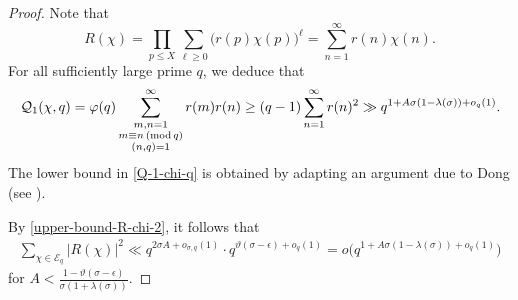 \documentclass[12pt]{amsart}
\numberwithin{equation}{section}
\theoremstyle{plain}
\theoremstyle{remark}
\theoremstyle{definition}
\theoremstyle{remark}
\renewcommand{\mod}[1]{\,({\rm mod}\,#1)}
\begin{document}
\begin{proof}
Note that
\[
R(\chi)=\prod_{p\leq X}\sum_{\ell\geq0}\big(r(p)\chi(p)\big)^{\ell}=\sum_{n=1}^{\infty}r(n)\chi(n).
\]
For all sufficiently large prime $q$, we deduce that
\begin{equation}\label{Q-1-chi-q}
\begin{aligned}
\mathcal{Q}_1(\chi,q)
=\varphi(q)\sum_{\substack{m,n=1 \\ m\equiv n\mod q \\ (n,q)=1}}^{\infty}r(m)r(n)
\geq(q-1)\sum_{n=1}^{\infty}r(n)^2
\gg q^{1+A\sigma(1-\lambda(\sigma))+o_q(1)}.
\end{aligned}
\end{equation}
The lower bound in \eqref{Q-1-chi-q} is obtained by adapting an argument due to Dong (see \cite[p.~79]{Dong2022}).

 By \eqref{upper-bound-R-chi-2}, it follows that
\begin{equation*}
\begin{aligned}
\sum_{\chi\in\mathcal{E}_q}|R(\chi)|^2
\ll q^{2\sigma A+o_{\sigma,q}(1)}\cdot q^{\vartheta(\sigma-\epsilon)+o_{q}(1)}
=o\big(q^{1+A\sigma(1-\lambda(\sigma))+o_q(1)}\big)
\end{aligned}
\end{equation*}
for $A<\frac{1-\vartheta(\sigma-\epsilon)}{\sigma(1+\lambda(\sigma))}$.


\end{proof}
\end{document}

